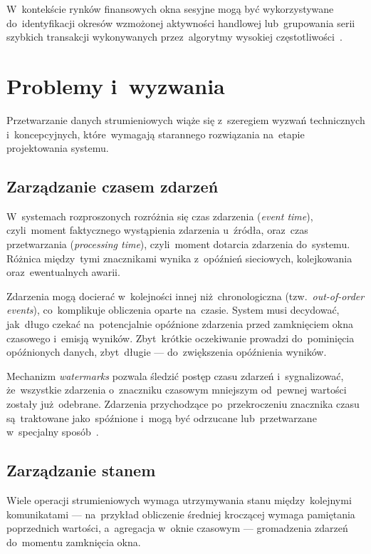 W~kontekście rynków finansowych okna sesyjne mogą być wykorzystywane do~identyfikacji okresów wzmożonej aktywności
handlowej lub~grupowania serii szybkich transakcji wykonywanych przez~algorytmy wysokiej częstotliwości~\cite{dataflow_model}.


\section[Problemy i wyzwania]{Problemy i~wyzwania}
\label{sec:problemy_strumieniowe}

Przetwarzanie danych strumieniowych wiąże się z~szeregiem wyzwań technicznych i~koncepcyjnych, które~wymagają
starannego rozwiązania na~etapie projektowania systemu.

\subsection{Zarządzanie czasem zdarzeń}
\label{subsec:czas_zdarzen}

W~systemach rozproszonych rozróżnia się czas zdarzenia (\textit{event time}), czyli~moment faktycznego wystąpienia
zdarzenia u~źródła, oraz~czas przetwarzania (\textit{processing time}), czyli~moment dotarcia zdarzenia do~systemu.
Różnica między~tymi znacznikami wynika z~opóźnień sieciowych, kolejkowania oraz~ewentualnych awarii.

Zdarzenia mogą docierać w~kolejności innej niż~chronologiczna (tzw.~\textit{out-of-order events}), co~komplikuje
obliczenia oparte na~czasie.
System musi decydować, jak~długo czekać na~potencjalnie opóźnione zdarzenia przed zamknięciem okna czasowego
i~emisją wyników.
Zbyt~krótkie oczekiwanie prowadzi do~pominięcia opóźnionych danych, zbyt~długie --- do~zwiększenia opóźnienia wyników.

Mechanizm \textit{watermarks} pozwala śledzić postęp czasu zdarzeń i~sygnalizować, że~wszystkie zdarzenia
o~znaczniku czasowym mniejszym od~pewnej wartości zostały już~odebrane.
Zdarzenia przychodzące po~przekroczeniu znacznika czasu są~traktowane jako~spóźnione i~mogą być odrzucane
lub~przetwarzane w~specjalny sposób~\cite{dataflow_model}.

\subsection{Zarządzanie stanem}
\label{subsec:zarzadzanie_stanem}

Wiele operacji strumieniowych wymaga utrzymywania stanu między~kolejnymi komunikatami --- na~przykład obliczenie
średniej kroczącej wymaga pamiętania poprzednich wartości, a~agregacja w~oknie czasowym --- gromadzenia zdarzeń
do~momentu zamknięcia okna.

